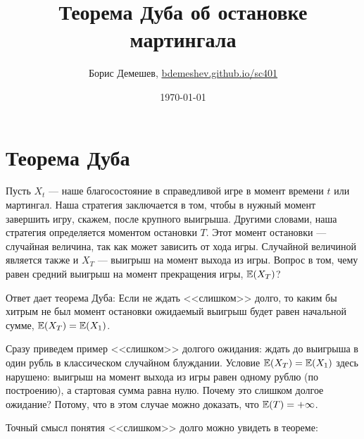 \documentclass[pdftex,12pt,a4paper]{article}
\title{Теорема Дуба об остановке мартингала}
\author{Борис Демешев, \url{bdemeshev.github.io/sc401}}
\date{\today}
\numberwithin{equation}{page} %
\theoremstyle{definition} %
\theoremstyle{definition}
\theoremstyle{definition}
\theoremstyle{definition}
\begin{document}
\maketitle





\section{Теорема Дуба}


Пусть $X_{t}$ --- наше благосостояние в справедливой игре в момент времени $t$ или мартингал. Наша стратегия заключается в том, чтобы в нужный момент завершить игру, скажем, после крупного выигрыша. Другими словами, наша стратегия определяется моментом остановки $T$. Этот момент остановки --- случайная величина, так как может зависить от хода игры. Случайной величиной является также и $X_{T}$ --- выигрыш на момент выхода из игры. Вопрос в том, чему равен средний выигрыш на момент прекращения игры, $\mathbb{E}(X_{T})$?

Ответ дает теорема Дуба:
Если не ждать <<слишком>> долго, то каким бы хитрым не был момент остановки ожидаемый выигрыш будет равен начальной сумме, $\mathbb{E}(X_{T})=\mathbb{E}(X_{1})$. 

Сразу приведем пример <<слишком>> долгого ожидания: ждать до выигрыша в один рубль в классическом случайном блуждании. Условие  $\mathbb{E}(X_{T})=\mathbb{E}(X_{1})$ здесь нарушено: выигрыш на момент выхода из игры равен одному рублю (по построению), а стартовая сумма равна нулю. Почему это слишком долгое ожидание? Потому, что в этом случае можно доказать, что $\mathbb{E}(T)=+\infty$. 

Точный смысл понятия <<слишком>> долго можно увидеть в теореме: 
\end{document}
